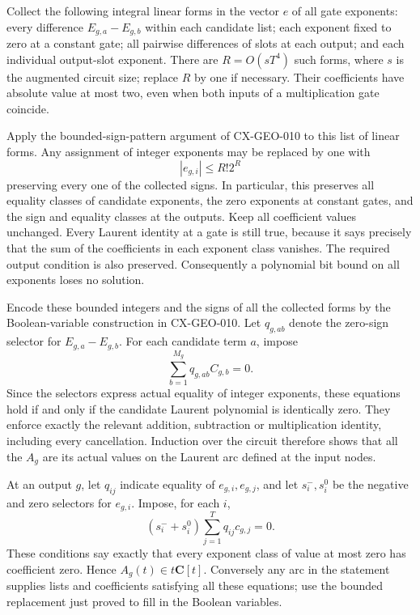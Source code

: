 \documentclass[11pt,a4paper]{article}
\begin{document}
Collect the following integral linear forms in the vector $e$ of all
gate exponents: every difference $E_{g,a}-E_{g,b}$ within each candidate
list; each exponent fixed to zero at a constant gate; all pairwise
differences of slots at each output; and each individual output-slot
exponent. There are $R=O(sT^4)$ such forms, where $s$ is the augmented
circuit size; replace $R$ by one if necessary. Their coefficients have
absolute value at most two, even when both inputs of a multiplication
gate coincide.

Apply the bounded-sign-pattern argument of CX-GEO-010 to this list of
linear forms. Any assignment of integer exponents may be replaced by
one with
\[
                            |e_{g,i}|\le R!2^R
\]
preserving every one of the collected signs. In particular, this
preserves all equality classes of candidate exponents, the zero
exponents at constant gates, and the sign and equality classes at the
outputs. Keep all coefficient values unchanged. Every Laurent identity
at a gate is still true, because it says precisely that the sum of the
coefficients in each exponent class vanishes. The required output
condition is also preserved. Consequently a polynomial bit bound on all
exponents loses no solution.

Encode these bounded integers and the signs of all the collected forms
by the Boolean-variable construction in CX-GEO-010. Let
$q_{g,ab}$ denote the zero-sign selector for
$E_{g,a}-E_{g,b}$. For each candidate term $a$, impose
\[
                       \sum_{b=1}^{M_g}q_{g,ab}C_{g,b}=0.
\]
Since the selectors express actual equality of integer exponents,
these equations hold if and only if the candidate Laurent polynomial
is identically zero. They enforce exactly the relevant addition,
subtraction or multiplication identity, including every cancellation.
Induction over the circuit therefore shows that all the $A_g$ are its
actual values on the Laurent arc defined at the input nodes.

At an output $g$, let $q_{ij}$ indicate equality of $e_{g,i},e_{g,j}$,
and let $s_i^-,s_i^0$ be the negative and zero selectors for $e_{g,i}$.
Impose, for each $i$,
\[
                 (s_i^-+s_i^0)\sum_{j=1}^T q_{ij}c_{g,j}=0.
\]
These conditions say exactly that every exponent class of value at
most zero has coefficient zero. Hence $A_g(t)\in t\mathbf C[t]$.
Conversely any arc in the statement supplies lists and coefficients
satisfying all these equations; use the bounded replacement just proved
to fill in the Boolean variables.
\end{document}
